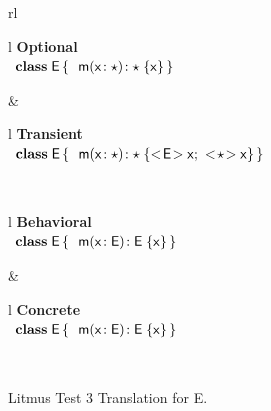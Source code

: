 \documentclass[a4paper,USenglish]{tex/lipics-v2016}
\begin{document}
\begin{figure}[!h]
  \begin{tabular}{rl}
\\
  \begin{tabular}{l}
    {\scriptsize\bf{Optional}} \\ 
\(
\begin{array}{l@{\,}l}
\Class{\xt E}{}{&\Mdef\m\x{\any}{\any}\x } \\
\end{array}
\) 
\end{tabular}&
  \begin{tabular}{l}
    {\scriptsize\bf{Transient}} \\
\(
\begin{array}{l@{\,}l}
\Class{\xt E}{}{&\Mdef\m\x\any\any{\SubCast{\xt E}\x ; ~ \SubCast{\any}{\x}}} \\
\end{array}
\)
\end{tabular}\\
  \begin{tabular}{l}
    {\scriptsize\bf{Behavioral}} \\
\(
\begin{array}{l@{\,}l}
\Class{\xt E}{}{&\Mdef\m\x{\xt E}{\xt E}\x} \\
\end{array}
\) 
\end{tabular} &
  \begin{tabular}{l}
    {\scriptsize\bf{Concrete}} \\
\(
\begin{array}{l@{\,}l}
\Class{\xt E}{}{&\Mdef\m\x{\xt E}{\xt E}\x} \\
\end{array}
\) 
\end{tabular}\\
  \end{tabular}
  
 \caption{Litmus Test 3 Translation for {\xt E}.}  \label{fig:l3etrans}
\end{figure}
\end{document}
